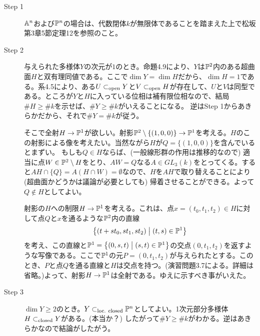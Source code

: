 \begin{description}
  \item[Step 1] $\A^n$および$\P^n$の場合は、代数閉体$k$が無限体であることを踏まえた上で松坂\cite{松坂} 第3章5節定理12を参照のこと。
  \item[Step 2] 与えられた多様体$Y$の次元が$1$のとき。命題4.9により、$Y$は$\P^2$内のある超曲面$H$と双有理同値である。ここで$\dim Y = \dim H$だから、$\dim H = 1$である。系4.5により、ある$U \opsub Y$と$V \opsub H$が存在して、$U$と$V$は同型である。ところが$Y$と$H$に入っている位相は補有限位相なので、結局$\# H \geq \# k$を示せば、$\# Y \geq \# k$がいえることになる。
  逆はStep 1からあきらかだから、それで$\# Y = \# k$が従う。

  そこで全射$H \to \P^1$が欲しい。射影$\P^2 \sm \{ (1,0,0)\} \to \P^1$を考える。$H$のこの射影による像を考えたい。当然ながら$H$が$Q = \{ (1,0,0)\}$を含んでいるとまずい。
  もしも$Q \in H$ならば、(一般線形群の作用は推移的なので) 適当に点$W \in \P^2 \sm H$をとり、$AW = Q$なる$A \in GL_{3}(k)$をとってくる。すると$AH \cap \{ Q \} = A(H \cap W) = \emptyset$なので、$H$を$AH$で取り替えることにより(超曲面かどうかは議論が必要としても) 帰着させることができる。よって$Q \notin H$としてよい。

  射影の$H$への制限$H \to \P^1$を考える。これは、点$x = (t_0,t_1,t_2) \in H$に対して点$Q$と$x$を通るような$\P^2$内の直線
\[
\setmid{(t+st_0, st_1,  st_2)}{(t,s ) \in \P^1}
\]
  を考え、この直線と$\P^1 = \setmid{(0,s, t)}{(s,t) \in \P^1}$の交点$(0, t_1, t_2)$を返すような写像である。ここで$\P^1$の元$P = (0,t_1, t_2)$が与えられたとする。このとき、$P$と点$Q$を通る直線と$H$は交点を持つ。(演習問題3.7による。詳細は省略。)よって、射影$H \to \P^1$は全射である。ゆえに示すべき事がいえた。
  \item[Step 3] $\dim Y \geq 2$のとき。$Y \loc \P^n$としてよい。1次元部分多様体$H \clsub Y$がある。(本当か？) したがって$\# Y \geq \# k$がわかる。逆はあきらかなので結論がしたがう。
\end{description}
